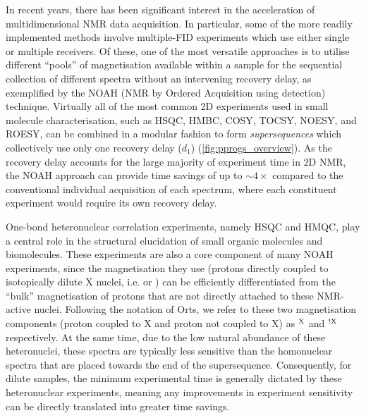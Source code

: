 \documentclass[11pt]{article}
\newcommand*{\carbon}{\ce{^{13}C}}
\newcommand*{\proton}{\ce{^{1}H}}
\newcommand*{\nitrogen}{\ce{^{15}N}}
\newcommand*{\magn}[1]{\ce{^1H}$^{#1}$}
\newcommand*{\magnnot}[1]{\ce{^1H}$^{!#1}$}
\begin{document}
\begin{refsection}
In recent years, there has been significant interest in the acceleration of multidimensional NMR data acquisition.\autocite{reducedd1, ultrafast, timeshared, multireceive, other_multifid, Kupce2021PNMRS}
In particular, some of the more readily implemented methods involve multiple-FID experiments which use either single or multiple receivers.
Of these, one of the most versatile approaches is to utilise different ``pools'' of magnetisation available within a sample for the sequential collection of different spectra without an intervening recovery delay, as exemplified by the NOAH (NMR by Ordered Acquisition using \proton{} detection) technique.\autocite{noah}
Virtually all of the most common 2D experiments used in small molecule characterisation, such as HSQC, HMBC, COSY, TOCSY, NOESY, and ROESY, can be combined in a modular fashion to form \textit{supersequences} which collectively use only one recovery delay ($d_1$) (\cref{fig:pprogs_overview}).
As the recovery delay accounts for the large majority of experiment time in 2D NMR, the NOAH approach can provide time savings of up to $\sim 4\times$ compared to the conventional individual acquisition of each spectrum, where each constituent experiment would require its own recovery delay.

One-bond heteronuclear correlation experiments, namely HSQC and HMQC, play a central role in the structural elucidation of small organic molecules and biomolecules.\autocite{textbooks}
These experiments are also a core component of many NOAH experiments, since the magnetisation they use (protons directly coupled to isotopically dilute X nuclei, i.e. \carbon{} or \nitrogen{}) can be efficiently differentiated from the ``bulk'' magnetisation of protons that are not directly attached to these NMR-active nuclei.\autocite{isotopefilter}
Following the notation of Orts,\autocite{Orts2018M} we refer to these two magnetisation components (proton coupled to X and proton not coupled to X) as \magn{\ce{X}} and \magnnot{\ce{X}} respectively.
At the same time, due to the low natural abundance of these heteronuclei, these spectra are typically less sensitive than the homonuclear spectra that are placed towards the end of the supersequence.
Consequently, for dilute samples, the minimum experimental time is generally dictated by these heteronuclear experiments, meaning any improvements in experiment sensitivity can be directly translated into greater time savings.


\end{refsection}
\end{document}
